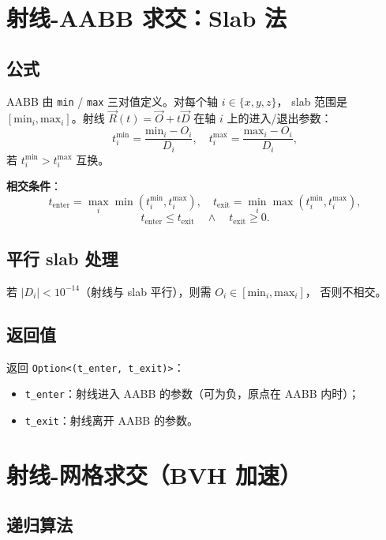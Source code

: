 \documentclass[11pt,a4paper]{article}
\begin{document}
\section{射线-AABB 求交：Slab 法}

\subsection{公式}

AABB 由 \texttt{min} / \texttt{max} 三对值定义。对每个轴 $i \in \{x, y, z\}$，
slab 范围是 $[\text{min}_i, \text{max}_i]$。射线 $\vec{R}(t) = \vec{O} + t\vec{D}$
在轴 $i$ 上的进入/退出参数：
\[
  t_i^{\min} = \frac{\text{min}_i - O_i}{D_i}, \quad
  t_i^{\max} = \frac{\text{max}_i - O_i}{D_i},
\]
若 $t_i^{\min} > t_i^{\max}$ 互换。

\textbf{相交条件}：
\[
  t_{\text{enter}} = \max_i \min(t_i^{\min}, t_i^{\max}), \quad
  t_{\text{exit}}  = \min_i \max(t_i^{\min}, t_i^{\max}),
\]
\[
  t_{\text{enter}} \le t_{\text{exit}} \quad \wedge \quad t_{\text{exit}} \ge 0.
\]

\subsection{平行 slab 处理}

若 $|D_i| < 10^{-14}$（射线与 slab 平行），则需 $O_i \in [\text{min}_i, \text{max}_i]$，
否则不相交。

\subsection{返回值}

返回 \texttt{Option<(t\_enter, t\_exit)>}：
\begin{itemize}
  \item \texttt{t\_enter}：射线进入 AABB 的参数（可为负，原点在 AABB 内时）；
  \item \texttt{t\_exit}：射线离开 AABB 的参数。
\end{itemize}

\section{射线-网格求交（BVH 加速）}

\subsection{递归算法}
\end{document}

